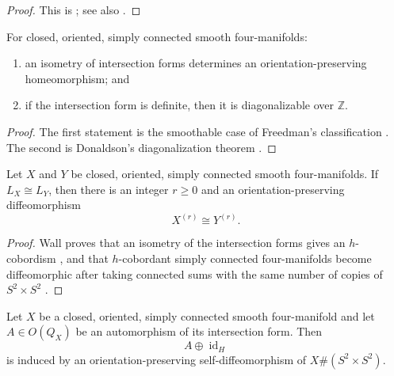 \begin{proof}
This is \cite[Theorem~1.2.21]{GompfStipsicz1999}; see also
\cite[Theorem~2.3.1]{PetersSterk2024}.
\end{proof}

\begin{theorem}
\label{thm:freedman-donaldson}
For closed, oriented, simply connected smooth four-manifolds:
\begin{enumerate}[label=(\roman*),ref=\roman*]
  \item an isometry of intersection forms determines an
  orientation-preserving homeomorphism; and
  \item if the intersection form is definite, then it is diagonalizable
  over $\mathbb Z$.
\end{enumerate}
\end{theorem}

\begin{proof}
The first statement is the smoothable case of Freedman's classification
\cite[Theorem~1.2.27]{GompfStipsicz1999,Freedman1982}.  The second is
Donaldson's diagonalization theorem
\cite[Theorem~1.2.30]{GompfStipsicz1999,Donaldson1983}.
\end{proof}

\begin{theorem}
\label{thm:wall-stable-classification}
Let $X$ and $Y$ be closed, oriented, simply connected smooth
four-manifolds.  If $L_X\cong L_Y$, then there is an integer $r\geq 0$ and
an orientation-preserving diffeomorphism
\[
  X^{(r)}\cong Y^{(r)}.
\]
\end{theorem}

\begin{proof}
Wall proves that an isometry of the intersection forms gives an
$h$-cobordism \cite[Theorem~2]{Wall1964}, and that $h$-cobordant simply
connected four-manifolds become diffeomorphic after taking connected sums
with the same number of copies of $S^2\times S^2$
\cite[Theorem~3]{Wall1964}.
\end{proof}

\begin{theorem}
\label{thm:ruberman-strle-realization}
Let $X$ be a closed, oriented, simply connected smooth four-manifold and let
$A\in O(Q_X)$ be an automorphism of its intersection form.  Then
\[
  A\oplus\operatorname{id}_H
\]
is induced by an orientation-preserving self-diffeomorphism of
$X\#(S^2\times S^2)$.
\end{theorem}


